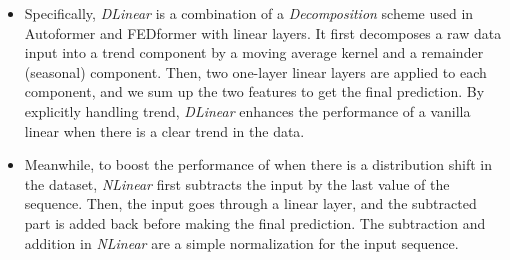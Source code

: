 \begin{itemize}

\item Specifically, \emph{DLinear} is a combination of a \emph{Decomposition} scheme used in Autoformer and FEDformer with linear layers. It first decomposes a raw data input into a trend component by a moving average kernel and a remainder (seasonal) component. Then, two one-layer linear layers are applied to each component, and we sum up the two features to get the final prediction.
%
By explicitly handling trend, \emph{DLinear} enhances the performance of a vanilla linear when there is a clear trend in the data. 
%
\item Meanwhile, to boost the performance of \modelname when there is a distribution shift in the dataset, \emph{NLinear} first subtracts the input by the last value of the sequence. Then, the input goes through a linear layer, and the subtracted part is added back before making the final prediction. The subtraction and addition in \emph{NLinear} are a simple normalization for the input sequence.
%
\end{itemize}
